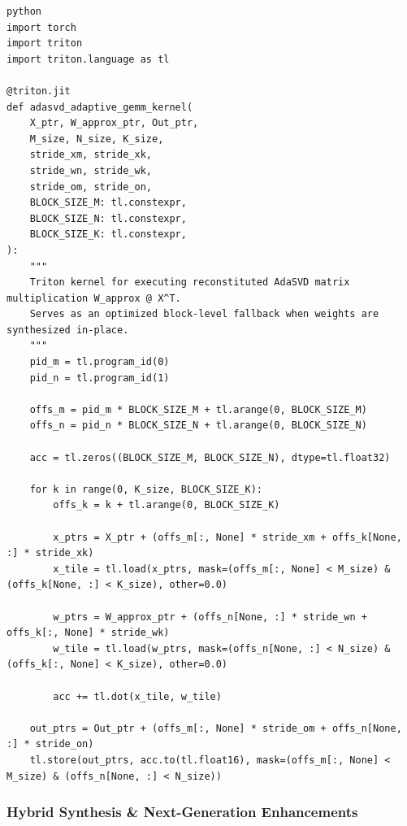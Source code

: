 \vspace{0.5em}
\begin{mdframed}[backgroundcolor=codebg, linecolor=codeframe, linewidth=1pt, roundcorner=4pt, innerleftmargin=2pt, innerrightmargin=5pt, innertopmargin=5pt, innerbottommargin=5pt]
\begin{lstlisting}
python
import torch
import triton
import triton.language as tl

@triton.jit
def adasvd_adaptive_gemm_kernel(
    X_ptr, W_approx_ptr, Out_ptr,
    M_size, N_size, K_size,
    stride_xm, stride_xk,
    stride_wn, stride_wk,
    stride_om, stride_on,
    BLOCK_SIZE_M: tl.constexpr,
    BLOCK_SIZE_N: tl.constexpr,
    BLOCK_SIZE_K: tl.constexpr,
):
    """
    Triton kernel for executing reconstituted AdaSVD matrix multiplication W_approx @ X^T.
    Serves as an optimized block-level fallback when weights are synthesized in-place.
    """
    pid_m = tl.program_id(0)
    pid_n = tl.program_id(1)

    offs_m = pid_m * BLOCK_SIZE_M + tl.arange(0, BLOCK_SIZE_M)
    offs_n = pid_n * BLOCK_SIZE_N + tl.arange(0, BLOCK_SIZE_N)

    acc = tl.zeros((BLOCK_SIZE_M, BLOCK_SIZE_N), dtype=tl.float32)

    for k in range(0, K_size, BLOCK_SIZE_K):
        offs_k = k + tl.arange(0, BLOCK_SIZE_K)

        x_ptrs = X_ptr + (offs_m[:, None] * stride_xm + offs_k[None, :] * stride_xk)
        x_tile = tl.load(x_ptrs, mask=(offs_m[:, None] < M_size) & (offs_k[None, :] < K_size), other=0.0)

        w_ptrs = W_approx_ptr + (offs_n[None, :] * stride_wn + offs_k[:, None] * stride_wk)
        w_tile = tl.load(w_ptrs, mask=(offs_n[None, :] < N_size) & (offs_k[:, None] < K_size), other=0.0)

        acc += tl.dot(x_tile, w_tile)

    out_ptrs = Out_ptr + (offs_m[:, None] * stride_om + offs_n[None, :] * stride_on)
    tl.store(out_ptrs, acc.to(tl.float16), mask=(offs_m[:, None] < M_size) & (offs_n[None, :] < N_size))
\end{lstlisting}
\end{mdframed}
\vspace{0.5em}


\subsubsection*{Hybrid Synthesis \& Next-Generation Enhancements}

